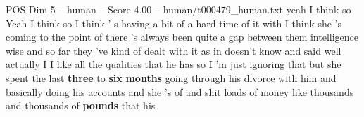 \begin{textsample}{POS Dim 5 – human – Score 4.00 – human/t000479\_human.txt}  \label{ex:f5_pos_013}
yeah I think so Yeah I think so I think ' s having a bit of a hard time of it with I think she 's coming to the point of there 's always been quite a gap between them intelligence wise and so far they 've kind of dealt with it as in doesn't know and said well actually I I like all the qualities that he has so I 'm just ignoring that but she spent the last \textbf{three} to \textbf{six} \textbf{months} going through his divorce with him and basically doing his accounts and she 's of and shit loads of money like thousands and thousands of \textbf{pounds} that his

\end{textsample}
